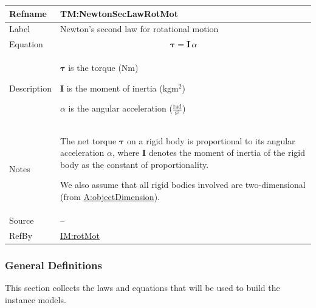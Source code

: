 \documentclass[12pt]{article}
\begin{document}
\medskip
\noindent
\begin{minipage}{\textwidth}
\begin{tabular}{>{\raggedright}p{}>{\raggedright\arraybackslash}p{}}
\toprule \textbf{Refname} & \textbf{TM:NewtonSecLawRotMot}
\label{TM:NewtonSecLawRotMot}
\\ \midrule
Label & Newton's second law for rotational motion
        
\\ \midrule
Equation & \begin{displaymath}
           \symbf{τ}=\symbf{I}\,α
           \end{displaymath}
\\ \midrule
Description & \begin{symbDescription}
              \item{$\symbf{τ}$ is the torque ($\text{N}\text{m}$)}
              \item{$\symbf{I}$ is the moment of inertia ($\text{kg}\text{m}^{2}$)}
              \item{$α$ is the angular acceleration ($\frac{\text{rad}}{\text{s}^{2}}$)}
              \end{symbDescription}
\\ \midrule
Notes & The net torque $\symbf{τ}$ on a rigid body is proportional to its angular acceleration $α$, where $\symbf{I}$ denotes the moment of inertia of the rigid body as the constant of proportionality.
        
        We also assume that all rigid bodies involved are two-dimensional (from \hyperref[assumpOD]{A:objectDimension}).
        
\\ \midrule
Source & --
         
\\ \midrule
RefBy & \hyperref[IM:rotMot]{IM:rotMot}
        
\\ \bottomrule
\end{tabular}
\end{minipage}

\subsubsection{General Definitions}
\label{Sec:GDs}
This section collects the laws and equations that will be used to build the instance models.
\end{document}
